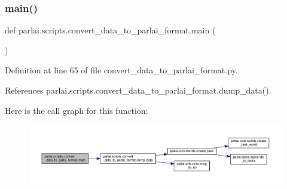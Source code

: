 \subsubsection{\texorpdfstring{main()}{main()}}
{\footnotesize\ttfamily def parlai.\+scripts.\+convert\+\_\+data\+\_\+to\+\_\+parlai\+\_\+format.\+main (\begin{DoxyParamCaption}{ }\end{DoxyParamCaption})}



Definition at line 65 of file convert\+\_\+data\+\_\+to\+\_\+parlai\+\_\+format.\+py.



References parlai.\+scripts.\+convert\+\_\+data\+\_\+to\+\_\+parlai\+\_\+format.\+dump\+\_\+data().

Here is the call graph for this function\+:
\nopagebreak
\begin{figure}[H]
\begin{center}
\leavevmode
\includegraphics[width=350pt]{namespaceparlai_1_1scripts_1_1convert__data__to__parlai__format_a1cdf007fb0ed5951c0dfb135500d47cd_cgraph}
\end{center}
\end{figure}

